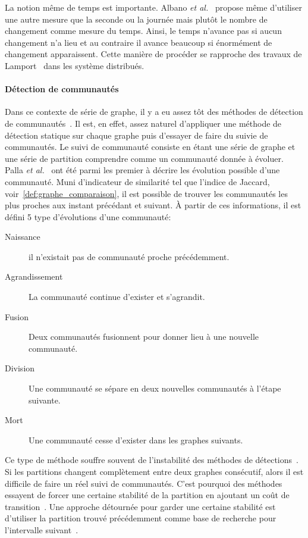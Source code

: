 La notion même de temps est importante.
Albano \emph{et al.}~\cite{Albano2014} propose même d'utiliser une autre mesure que la seconde ou la journée mais plutôt le nombre de changement comme mesure du temps.
Ainsi, le temps n'avance pas si aucun changement n'a lieu et au contraire il avance beaucoup si énormément de changement apparaissent.
Cette manière de procéder se rapproche des travaux de Lamport~\cite{Lamport1978} dans les système distribués.

\paragraph{Détection de communautés}
Dans ce contexte de série de graphe, il y a eu assez tôt des méthodes de détection de communautés~\cite{Hopcroft2004,Sun2007,Lin2008,Asur2009}.
Il est, en effet, assez naturel d'appliquer une méthode de détection statique sur chaque graphe puis d'essayer de faire du suivie de communautés.
Le suivi de communauté consiste en étant une série de graphe et une série de partition comprendre comme un communauté donnée à évoluer.
Palla \emph{et al.}~\cite{Palla2007} ont été parmi les premier à décrire les évolution possible d'une communauté.
Muni d'indicateur de similarité tel que l'indice de Jaccard, voir~\ref{def:graphe_comparaison}, il est possible de trouver les communautés les plus proches aux instant précédant et suivant.
\`A partir de ces informations, il est défini 5 type d'évolutions d'une communauté:
\begin{description}
\item[Naissance] il n'existait pas de communauté proche précédemment.
\item[Agrandissement] La communauté continue d'exister et s'agrandit.
\item[Fusion] Deux communautés fusionnent pour donner lieu à une nouvelle communauté.
\item[Division] Une communauté se sépare en deux nouvelles communautés à l'étape suivante.
\item[Mort] Une communauté cesse d'exister dans les graphes suivants.
\end{description}

Ce type de méthode souffre souvent de l'instabilité des méthodes de détections~\cite{Aynaud2010,Harenberg2014a}.
Si les partitions changent complètement entre deux graphes consécutif, alors il est difficile de faire un réel suivi de communautés.
C'est pourquoi des méthodes essayent de forcer une certaine stabilité de la partition en ajoutant un coût de transition~\cite{Chakrabarti2006,Chen2013,Kalavathi2015}.
Une approche détournée pour garder une certaine stabilité est d'utiliser la partition trouvé précédemment comme base de recherche pour l'intervalle suivant~\cite{Lancichinetti2011a,Corneli2016}.

